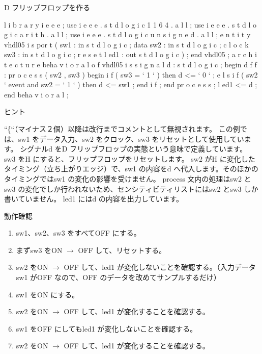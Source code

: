 \documentclass[letterpaper,10pt,dvipdfmx]{sphinxmanual}
\begin{document}
D フリップフロップを作る

l i b r a r y i e e e ;
use i e e e . s t d l o g i c 1 1 6 4 . a l l ;
use i e e e . s t d l o g i c a r i t h . a l l ;
use i e e e . s t d l o g i c u n s i g n e d . a l l ;
e n t i t y vhdl05 i s
por t (
sw1 : in s t d l o g i c ;    data
sw2 : in s t d l o g i c ;    c l o c k
sw3 : in s t d l o g i c ;    r e s e t
l ed1 : out s t d l o g i c
) ;
end vhdl05 ;
a r c h i t e c t u r e beha v i o r a l o f vhdl05 i s
s i g n a l d : s t d l o g i c ;
begin
d f f : pr o c e s s ( sw2 , sw3 )
begin
i f ( sw3 = ` 1 ` ) then
d \textless{}= ` 0 ` ;
e l s i f ( sw2 ` event and sw2 = ` 1 ` ) then
d \textless{}= sw1 ;
end i f ;
end pr o c e s s ;
l ed1 \textless{}= d ;
end beha v i o r a l ;

ヒント

``\{``（マイナス２個）以降は改行までコメントとして無視されます。
この例では、sw1 をデータ入力、sw2 をクロック、sw3 をリセットとして使用しています。
シグナルd をD フリップフロップの実態という意味で定義しています。
sw3 をH にすると、フリップフロップをリセットします。
sw2 がH に変化したタイミング（立ち上がりエッジ）で、sw1 の内容をd へ代入します。そのほかのタイミングではsw1 の変化の影響を受けません。
process 文内の処理はsw2 とsw3 の変化でしか行われないため、センシティビティリストにはsw2 とsw3 しか書いていません。
led1 にはd の内容を出力しています。

動作確認
\begin{enumerate}
\item {} 
sw1、sw2、sw3 をすべてOFF にする。

\item {} 
まずsw3 をON \(\rightarrow\) OFF して、リセットする。

\item {} 
sw2 をON \(\rightarrow\) OFF して、led1 が変化しないことを確認する。（入力データsw1 がOFF なので、OFF のデータを改めてサンプルするだけ）

\item {} 
sw1 をON にする。

\item {} 
sw2 をON \(\rightarrow\) OFF して、led1 が変化することを確認する。

\item {} 
sw1 をOFF にしてもled1 が変化しないことを確認する。

\item {} 
sw2 をON \(\rightarrow\) OFF して、led1 が変化することを確認する。

\end{enumerate}
\end{document}
